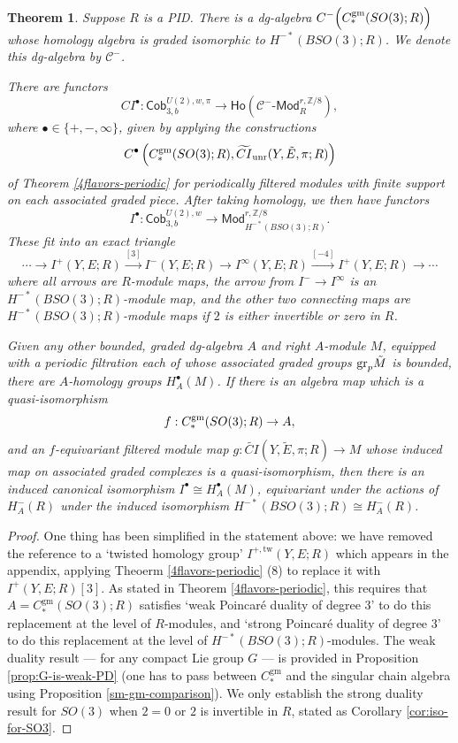 \documentclass{memo-l}
\newtheorem{theorem}{Theorem}[chapter]
\theoremstyle{definition}
\theoremstyle{remark}
\numberwithin{section}{chapter}
\numberwithin{equation}{chapter}
\begin{document}
\begin{theorem}\label{4flavors-instanton}Suppose $R$ is a PID. There is a dg-algebra $C^-\Big(C_*^{\textup{gm}}(SO(3);R)\Big)$ whose homology algebra is graded isomorphic to $H^{-*}(BSO(3);R)$. We denote this dg-algebra by $\mathcal C^-$.

There are functors $$CI^\bullet: \mathsf{Cob}_{3,b}^{U(2),w,\pi} \to \mathsf{Ho}\left(\mathcal C^-\text{-}\mathsf{Mod}_R^{r,\mathbb Z/8}\right),$$ where $\bullet \in \{+, -, \infty\}$, given by applying the constructions $$C^\bullet\left(C_*^{\textup{gm}}(SO(3);R), \widetilde{CI}_\textup{unr}(Y,\tilde E,\pi;R)\right)$$ of Theorem \ref{4flavors-periodic} for periodically filtered modules with finite support on each associated graded piece. After taking homology, we then have functors $$I^\bullet: \mathsf{Cob}_{3,b}^{U(2),w} \to \mathsf{Mod}^{r,\mathbb Z/8}_{H^{-*}(BSO(3);R)}.$$ These fit into an exact triangle $$\cdots \to I^+(Y,E;R) \xrightarrow{[3]} I^-(Y,E;R) \to I^\infty(Y,E;R) \xrightarrow{[-4]} I^+(Y,E;R) \to \cdots$$ where all arrows are $R$-module maps, the arrow from $I^- \to I^\infty$ is an $H^{-*}(BSO(3);R)$-module map, and the other two connecting maps are $H^{-*}(BSO(3);R)$-module maps if $2$ is either invertible or zero in $R$.

Given any other bounded, graded dg-algebra $A$ and right $A$-module $M$, equipped with a periodic filtration each of whose associated graded groups $\textup{gr}_p \tilde M$ is bounded, there are $A$-homology groups $H^\bullet_A(M)$. If there is an algebra map which is a quasi-isomorphism $$f: C_*^{\textup{gm}}(SO(3);R) \to A,$$ and an $f$-equivariant filtered module map $g: \widetilde{CI}(Y, \tilde E, \pi; R) \to M$ whose induced map on associated graded complexes is a quasi-isomorphism, then there is an induced canonical isomorphism $I^\bullet \cong H^\bullet_A(M)$, equivariant under the actions of $H^-_A(R)$ under the induced isomorphism $H^{-*}(BSO(3);R) \cong H^-_A(R)$.
\end{theorem}

\begin{proof}
One thing has been simplified in the statement above: we have removed the reference to a `twisted homology group' $I^{+,\text{tw}}(Y,E;R)$ which appears in the appendix, applying Theoerm \ref{4flavors-periodic} (8) to replace it with $I^+(Y,E;R)[3]$. As stated in Theorem \ref{4flavors-periodic}, this requires that $A = C_*^{\text{gm}}(SO(3);R)$ satisfies `weak Poincar\'e duality of degree $3$' to do this replacement at the level of $R$-modules, and `strong Poincar\'e duality of degree $3$' to do this replacement at the level of $H^{-*}(BSO(3);R)$-modules. The weak duality result --- for any compact Lie group $G$ --- is provided in Proposition \ref{prop:G-is-weak-PD} (one has to pass between $C_*^{\text{gm}}$ and the singular chain algebra using Proposition \ref{sm-gm-comparison}). We only establish the strong duality result for $SO(3)$ when $2 = 0$ or $2$ is invertible in $R$, stated as Corollary \ref{cor:iso-for-SO3}.
\end{proof}
\end{document}
